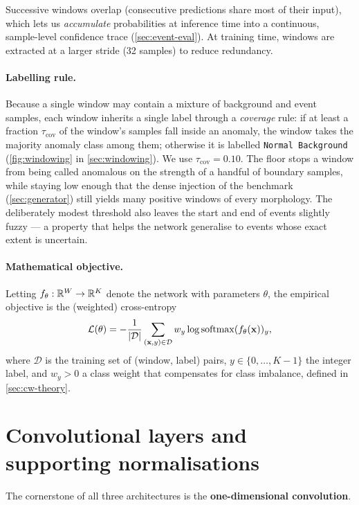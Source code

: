 Successive windows overlap (consecutive predictions share most of their
input), which lets us \emph{accumulate} probabilities at inference time
into a continuous, sample-level confidence trace
(\cref{sec:event-eval}). At training time, windows are extracted at a
larger stride (32 samples) to reduce redundancy.

\paragraph{Labelling rule.}
Because a single window may contain a mixture of background and event
samples, each window inherits a single label through a
\emph{coverage} rule: if at least a fraction $\tau_{\text{cov}}$ of the
window's samples fall inside an anomaly, the window takes the majority
anomaly class among them; otherwise it is labelled
\texttt{Normal Background} (\cref{fig:windowing} in
\cref{sec:windowing}). We use $\tau_{\text{cov}} = 0.10$. The floor stops
a window from being called anomalous on the strength of a handful of
boundary samples, while staying low enough that the dense injection of
the benchmark (\cref{sec:generator}) still yields many positive windows
of every morphology. The deliberately modest threshold also leaves the
start and end of events slightly fuzzy --- a property that helps the
network generalise to events whose exact extent is uncertain.

\paragraph{Mathematical objective.}
Letting $f_\theta : \mathbb{R}^W \to \mathbb{R}^K$ denote the network with parameters
$\theta$, the empirical objective is the (weighted) cross-entropy
\begin{equation}
    \mathcal{L}(\theta) = - \frac{1}{|\mathcal{D}|} \sum_{(\mathbf{x}, y) \in \mathcal{D}}
        w_y \log \operatorname{softmax}(f_\theta(\mathbf{x}))_y,
    \label{eq:cross-entropy}
\end{equation}
where $\mathcal{D}$ is the training set of (window, label) pairs,
$y \in \{0, \dots, K-1\}$ the integer label, and $w_y > 0$ a class
weight that compensates for class imbalance, defined in
\cref{sec:cw-theory}.

\section{Convolutional layers and supporting normalisations}
\label{sec:cnn-theory}

The cornerstone of all three architectures is the
\textbf{one-dimensional convolution}.

